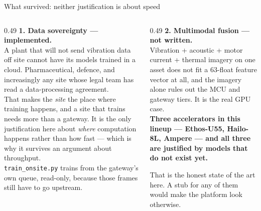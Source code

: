 \documentclass[aspectratio=169,10pt]{beamer}
\begin{document}
\begin{frame}{What survived: neither justification is about speed}
  \begin{columns}[T]
    \begin{column}{0.49\textwidth}
      \scriptsize
      \textbf{1. Data sovereignty --- implemented.}
      \\[1mm]
      A plant that will not send vibration data off site cannot have its models
      trained in a cloud. Pharmaceutical, defence, and increasingly any site
      whose legal team has read a data-processing agreement.
      \\[1mm]
      That makes the \emph{site} the place where training happens, and a site
      that trains needs more than a gateway. It is the only justification here
      about \emph{where} computation happens rather than how fast --- which is
      why it survives an argument about throughput.
      \\[1mm]
      \texttt{train\_onsite.py} trains from the gateway's own queue, read-only,
      because those frames still have to go upstream.
    \end{column}
    \begin{column}{0.49\textwidth}
      \scriptsize
      \textbf{2. Multimodal fusion --- not written.}
      \\[1mm]
      Vibration + acoustic + motor current + thermal imagery on one asset does
      not fit a 63-float feature vector at all, and the imagery alone rules out
      the MCU and gateway tiers. It is the real GPU case.
      \\[2mm]
      \color{pdmcrit}
      \textbf{Three accelerators in this lineup --- Ethos-U55, Hailo-8L, Ampere
      --- and all three are justified by models that do not exist yet.}
      \par\color{pdmink2}
      That is the honest state of the art here. A stub for any of them would
      make the platform look otherwise.
    \end{column}
  \end{columns}
\end{frame}
\end{document}
